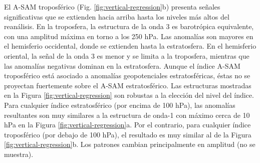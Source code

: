 \documentclass[12pt,oneside,a4paper]{reedthesis}
\begin{document}
El A-SAM troposférico (Fig. \ref{fig:vertical-regression}b) presenta señales significativas que se extienden hacia arriba hasta los niveles más altos del reanálisis.
En la troposfera, la estructura de la onda 3 es barotrópica equivalente, con una amplitud máxima en torno a los 250 hPa.
Las anomalías son mayores en el hemisferio occidental, donde se extienden hasta la estratosfera.
En el hemisferio oriental, la señal de la onda 3 es menor y se limita a la troposfera, mientras que las anomalías negativas dominan en la estratosfera.
Aunque el índice A-SAM troposférico está asociado a anomalías geopotenciales estratosféricas, éstas no se proyectan fuertemente sobre el A-SAM estratosférico.
Las estructuras mostradas en la Figura \ref{fig:vertical-regression} son robustas a la elección del nivel del índice.
Para cualquier índice estratosférico (por encima de 100 hPa), las anomalías resultantes son muy similares a la estructura de onda-1 con máximo cerca de 10 hPa en la Figura \ref{fig:vertical-regression}a.
Por el contrario, para cualquier índice troposférico (por debajo de 100 hPa), el resultado es muy similar al de la Figura \ref{fig:vertical-regression}b.
Los patrones cambian principalmente en amplitud (no se muestra).
\end{document}
